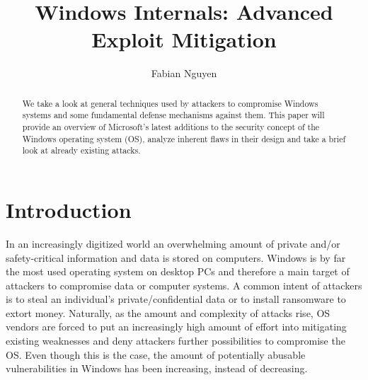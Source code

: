 \documentclass[10pt,twocolumn,a4paper]{article}
\author{Fabian Nguyen}
\begin{document}
\title{Windows Internals: Advanced Exploit Mitigation}

\maketitle


\begin{abstract}
We take a look at general techniques used by attackers to compromise Windows systems and some fundamental defense mechanisms against them.
This paper will provide an overview of Microsoft's latest additions to the security concept of the Windows operating system (OS), analyze inherent flaws in their design and take a brief look at already existing attacks. 
\end{abstract}

\section{Introduction}\label{sec:introduction}
In an increasingly digitized world an overwhelming amount of private and/or safety-critical information and data is stored on computers.
Windows is by far the most used operating system on desktop PCs \cite{OSshare} and therefore a main target of attackers to compromise data or computer systems.
A common intent of attackers is to steal an individual's private/confidential data or to install ransomware to extort money.
Naturally, as the amount and complexity of attacks rise, OS vendors are forced to put an increasingly high amount of effort into mitigating existing weaknesses and deny attackers  further possibilities to compromise the OS.
Even though this is the case, the amount of potentially abusable vulnerabilities in Windows has been increasing, instead of decreasing.
\end{document}
